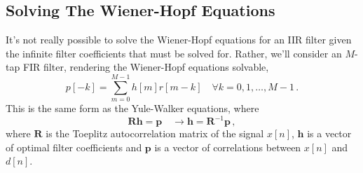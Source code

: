 \subsection{Solving The Wiener-Hopf Equations}
%
It's not really possible to solve the Wiener-Hopf equations for an IIR filter
given the infinite filter coefficients that must be solved for. Rather,
we'll consider an $M$-tap FIR filter, rendering the Wiener-Hopf equations
solvable,
%
\begin{displaymath}
  p[-k] = \sum_{m=0}^{M-1}h[m]r[m-k] \quad\forall k = 0, 1, \hdots, M-1 \,.
\end{displaymath}
%
This is the same form as the Yule-Walker equations, where
%
\begin{displaymath}
  \mathbf{Rh} = \mathbf{p} \quad\longrightarrow \mathbf{h} = \mathbf{R}^{-1}\mathbf{p} \,,
\end{displaymath}
%
where $\mathbf{R}$ is the Toeplitz autocorrelation matrix of the signal
$x[n]$, $\mathbf{h}$ is a vector of optimal filter coefficients and
$\mathbf{p}$ is a vector of correlations between $x[n]$ and $d[n]$.\\

